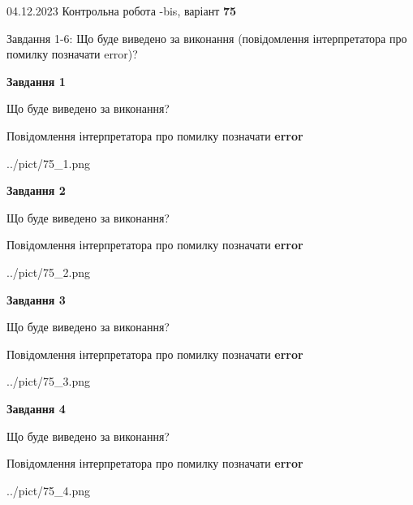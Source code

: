 \documentclass[12pt, ukrainian]{article}
\begin{document}
{{04.12.2023 Контрольна робота -bis, варіант  \No \textbf { 75 }\par}}
{

Завдання 1-6: Що буде виведено за виконання (повідомлення інтерпретатора про помилку позначати error)?


{\begin {center}\textbf{Завдання 1}\end {center}}\par
Що буде виведено за виконання? \par
Повідомлення інтерпретатора про помилку позначати \textbf{error}

\begin{center}
	{../pict/75_1.png}
\end{center}
\newpage

{\begin {center}\textbf{Завдання 2}\end {center}}\par
Що буде виведено за виконання? \par
Повідомлення інтерпретатора про помилку позначати \textbf{error}

\begin{center}
	{../pict/75_2.png}
\end{center}
\newpage

{\begin {center}\textbf{Завдання 3}\end {center}}\par
Що буде виведено за виконання? \par
Повідомлення інтерпретатора про помилку позначати \textbf{error}

\begin{center}
	{../pict/75_3.png}
\end{center}
\newpage

{\begin {center}\textbf{Завдання 4}\end {center}}\par
Що буде виведено за виконання? \par
Повідомлення інтерпретатора про помилку позначати \textbf{error}

\begin{center}
	{../pict/75_4.png}
\end{center}
\newpage

}
\end{document}
